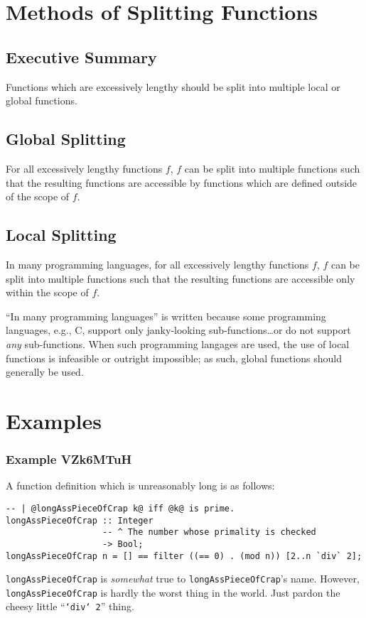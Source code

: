 \documentclass{report}
\begin{document}
\section{Methods of Splitting Functions}
\subsection{Executive Summary}
Functions which are excessively lengthy should be split into multiple local or global functions.
\subsection{Global Splitting}
For all excessively lengthy functions $f$, $f$ can be split into multiple functions such that the resulting functions are accessible by functions which are defined outside of the scope of $f$.
\subsection{Local Splitting}
In many programming languages, for all excessively lengthy functions $f$, $f$ can be split into multiple functions such that the resulting functions are accessible only within the scope of $f$.

``In many programming languages'' is written because some programming languages, e.g., C, support only janky-looking sub-functions\ldots or do not support \textit{any} sub-functions.  When such programming langages are used, the use of local functions is infeasible or outright impossible; as such, global functions should generally be used.
\section{Examples}
\subsubsection{Example VZk6MTuH}
A function definition which is unreasonably long is as follows:
\begin{lstlisting}
-- | @longAssPieceOfCrap k@ iff @k@ is prime.
longAssPieceOfCrap :: Integer
                   -- ^ The number whose primality is checked
                   -> Bool;
longAssPieceOfCrap n = [] == filter ((== 0) . (mod n)) [2..n `div` 2];
\end{lstlisting}
\texttt{longAssPieceOfCrap} is \textit{somewhat} true to \texttt{longAssPieceOfCrap}'s name.  However, \texttt{longAssPieceOfCrap} is hardly the worst thing in the world.  Just pardon the cheesy little ``\texttt{`div` 2}'' thing.
\end{document}
